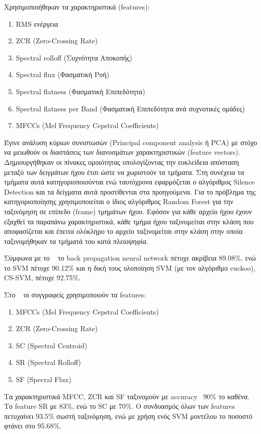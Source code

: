Χρησιμοποιήθηκαν τα χαρακτηριστικά (features):
\begin{enumerate}[noitemsep]
\item RMS ενέργεια
\item ZCR (Zero-Crossing Rate)
\item Spectral rolloff (Συχνότητα Αποκοπής)
\item Spectral flux (Φασματική Ροή)
\item Spectral flatness (Φασματική Επιπεδότητα)
\item Spectral flatness per Band (Φασματική Επιπεδότητα ανά συχνοτικές ομάδες)
\item MFCCs (Mel Frequency Cepstral Coefficients)
\end{enumerate}

Έγινε ανάλυση κύριων συνιστωσών (Principal component analysis ή PCA) με στόχο να
μειωθούν οι διαστάσεις των διανυσμάτων χαρακτηριστικών (feature vectors).
Δημιουργήθηκαν οι πίνακες ομοιότητας υπολογίζοντας την ευκλείδεια απόσταση
μεταξύ των δειγμάτων ήχου έτσι ώστε να χωριστούν τα τμήματα. Στη συνέχεια τα
τμήματα αυτά κατηγοριοποιούνται ενώ ταυτόχρονα εφαρμόζεται ο αλγόριθμος Silence
Detection και τα δείγματα αυτά προστίθενται στα προηγούμενα. Για το πρόβλημα της
κατηγοριοποίησης χρησιμοποιείται ο ίδιος αλγόριθμος Random Forest για την
ταξινόμηση σε επίπεδο (frame) τμημάτων ήχου. Εφόσον για κάθε αρχείο ήχου έχουν
εξαχθεί τα παραπάνω χαρακτηριστικά, κάθε τμήμα ήχου ταξινομείται στην κλάση που
αποφασίζεται και έπειτα ολόκληρο το αρχείο ταξινομείται στην κλάση στην οποία
ταξινομήθηκαν τα τμήματά του κατά πλειοψηφία.

\vspace{1em}
Σύμφωνα με το ~\cite{cuckoo} το back propagation neural network πέτυχε ακρίβεια
89.08\%, ενώ το SVM πέτυχε 90.12\% και η δική τους υλοποίηση SVM (με τον
αλγόριθμο cuckoo), CS-SVM, πέτυχε 92.75\%.

\vspace{1em}
Στο ~\cite{hybrid} οι συγγραφείς χρησιμοποιούν τα features:
\begin{enumerate}[noitemsep]
\item ΜFCCs (Mel Frequency Cepstral Coefficients)
\item ZCR (Zero-Crossing Rate)
\item SC (Spectral Centroid)
\item SR (Spectral Rolloff)
\item SF (Specral Flux)
\end{enumerate}

Τα χαρακτηριστικά ΜFCC, ZCR και SF ταξινομούν με accuracy ~90\% το καθένα. Το
feature SR με 83\%, ενώ το SC με 70\%. Ο συνδυασμός όλων των features πετυχαίνει
93.5\% σωστή ταξινόμηση, ενώ με χρήση ενός SVM μοντέλου το ποσοστό φτάνει στο
95.68\%.

